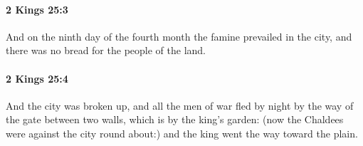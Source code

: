 		\paragraph{2 Kings 25:3} %
			\label{2KINGS-25-3}

			And on the ninth day of the fourth month the famine prevailed in the city, and there was no bread for the people of the land.


		\paragraph{2 Kings 25:4} %
			\label{2KINGS-25-4}

			And the city was broken up, and all the men of war fled by night by the way of the gate between two walls, which is by the king’s garden: (now the Chaldees were against the city round about:) and the king went the way toward the plain.


